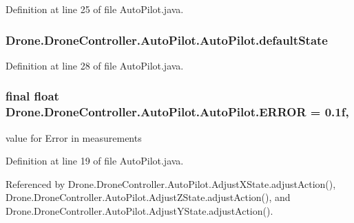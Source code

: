 Definition at line 25 of file Auto\+Pilot.\+java.

\hypertarget{class_drone_1_1_drone_controller_1_1_auto_pilot_1_1_auto_pilot_ade2467dd822e41b4543f86a5298184d7}{}
\subsubsection[{default\+State}]{ Drone.\+Drone\+Controller.\+Auto\+Pilot.\+Auto\+Pilot.\+default\+State\hspace{0.3cm}{\ttfamily [protected]}}\label{class_drone_1_1_drone_controller_1_1_auto_pilot_1_1_auto_pilot_ade2467dd822e41b4543f86a5298184d7}


Definition at line 28 of file Auto\+Pilot.\+java.

\hypertarget{class_drone_1_1_drone_controller_1_1_auto_pilot_1_1_auto_pilot_ae04d86839b6b6e571c1919dcc1910b07}{}
\subsubsection[{E\+R\+R\+O\+R}]{\setlength{\rightskip}{0pt plus 5cm}final float Drone.\+Drone\+Controller.\+Auto\+Pilot.\+Auto\+Pilot.\+E\+R\+R\+O\+R = 0.\+1f\hspace{0.3cm}{\ttfamily [static]}, {\ttfamily [protected]}}\label{class_drone_1_1_drone_controller_1_1_auto_pilot_1_1_auto_pilot_ae04d86839b6b6e571c1919dcc1910b07}
value for Error in measurements 

Definition at line 19 of file Auto\+Pilot.\+java.



Referenced by Drone.\+Drone\+Controller.\+Auto\+Pilot.\+Adjust\+X\+State.\+adjust\+Action(), Drone.\+Drone\+Controller.\+Auto\+Pilot.\+Adjust\+Z\+State.\+adjust\+Action(), and Drone.\+Drone\+Controller.\+Auto\+Pilot.\+Adjust\+Y\+State.\+adjust\+Action().

